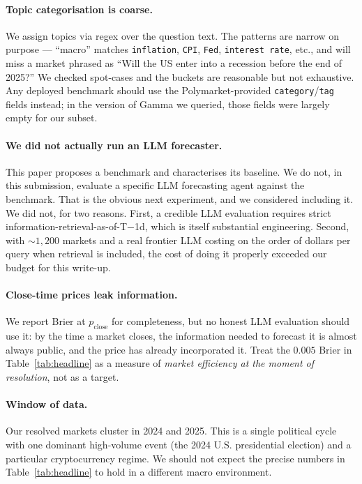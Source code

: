 \documentclass{article}
\begin{document}
\paragraph{Topic categorisation is coarse.}
We assign topics via regex over the question text. The patterns are
narrow on purpose --- ``macro'' matches \texttt{inflation},
\texttt{CPI}, \texttt{Fed}, \texttt{interest rate}, etc., and will
miss a market phrased as ``Will the US enter into a recession before
the end of 2025?'' We checked spot-cases and the buckets are
reasonable but not exhaustive. Any deployed benchmark should use the
Polymarket-provided \texttt{category}/\texttt{tag} fields instead;
in the version of Gamma we queried, those fields were largely empty
for our subset.

\paragraph{We did not actually run an LLM forecaster.}
This paper proposes a benchmark and characterises its baseline. We
do not, in this submission, evaluate a specific LLM forecasting
agent against the benchmark. That is the obvious next experiment,
and we considered including it. We did not, for two reasons.
First, a credible LLM evaluation requires strict
information-retrieval-as-of-T$-$1d, which is itself substantial
engineering. Second, with $\sim 1{,}200$ markets and a real frontier
LLM costing on the order of dollars per query when retrieval is
included, the cost of doing it properly exceeded our budget for this
write-up.

\paragraph{Close-time prices leak information.}
We report Brier at $p_{\mathrm{close}}$ for completeness, but no
honest LLM evaluation should use it: by the time a market closes,
the information needed to forecast it is almost always public, and
the price has already incorporated it. Treat the $0.005$ Brier in
Table~\ref{tab:headline} as a measure of \emph{market efficiency at
the moment of resolution}, not as a target.

\paragraph{Window of data.}
Our resolved markets cluster in 2024 and 2025. This is a single
political cycle with one dominant high-volume event (the 2024 U.S.
presidential election) and a particular cryptocurrency regime. We
should not expect the precise numbers in Table~\ref{tab:headline} to
hold in a different macro environment.
\end{document}
